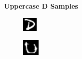 \documentclass[conference]{IEEEtran}
\begin{document}
\begin{figure}[h]
    \centering
    \textbf{Uppercase D Samples}\par\medskip 
    \begin{subfigure}{.10\textwidth}
        \centering
        \includegraphics[width=.90\textwidth]{./images/issues/D-0.png}
        \label{fig:issue_D01}
    \end{subfigure}%
    \begin{subfigure}{.10\textwidth}
        \centering
        \includegraphics[width=.90\textwidth]{./images/issues/D-01.png}

\end{subfigure}
\end{figure}
\end{document}
